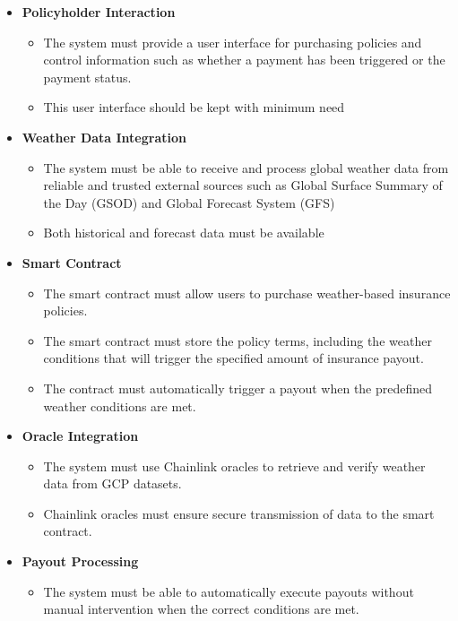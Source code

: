 \begin{itemize}
    \item \textbf{Policyholder Interaction}
    \begin{itemize}
        \item The system must provide a user interface for purchasing policies and control information such as whether a payment has been triggered or the payment status. 
        \item This user interface should be kept with minimum need
    \end{itemize}

    \item \textbf{Weather Data Integration} 
    \begin{itemize}
        \item The system must be able to receive and process global weather data from reliable and trusted external sources such as Global Surface Summary of the Day (GSOD) and Global Forecast System (GFS)
        \item Both historical and forecast data must be available
    \end{itemize}
    
    \item \textbf{Smart Contract}
    \begin{itemize}
        \item The smart contract must allow users to purchase weather-based insurance policies.
        \item The smart contract must store the policy terms, including the weather conditions that will trigger the specified amount of insurance payout.
        \item The contract must automatically trigger a payout when the predefined weather conditions are met.
    \end{itemize}
    
    \item \textbf{Oracle Integration}
    \begin{itemize}
        \item The system must use Chainlink oracles to retrieve and verify weather data from GCP datasets.
        \item Chainlink oracles must ensure secure transmission of data to the smart contract.
    \end{itemize}
    
    \item \textbf{Payout Processing}
    \begin{itemize}
        \item The system must be able to automatically execute payouts without manual intervention when the correct conditions are met.
    \end{itemize}
\end{itemize}

